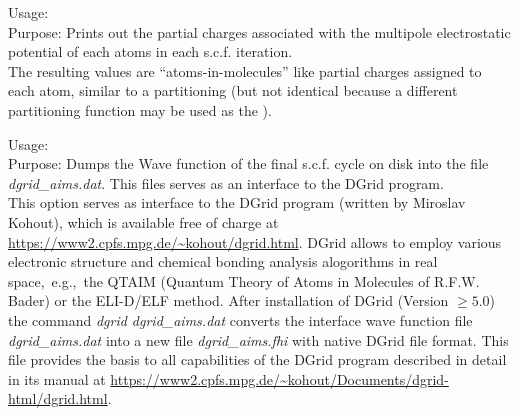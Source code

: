 {
  \noindent
  Usage:   \\[1.0ex]
  Purpose: Prints out the partial charges associated with the
    multipole electrostatic potential of each atoms in each
    s.c.f. iteration. \\[1.0ex]
}
The resulting values are ``atoms-in-molecules'' like partial charges
assigned to each atom, similar to a 
partitioning (but not identical because a different partitioning
function may be used as the ).


{
  \noindent
  Usage:   \\[1.0ex]
  Purpose: Dumps the Wave function of the final s.c.f. cycle on
  disk into the file \emph{dgrid\_aims.dat}. This files serves
  as an interface to the DGrid program.\\[1.0ex]
}
This option serves as interface to the DGrid program (written by Miroslav Kohout),
which is available free of charge at \url{https://www2.cpfs.mpg.de/~kohout/dgrid.html}.
DGrid allows to employ various electronic structure and chemical bonding analysis
alogorithms in real space,~e.g.,~the QTAIM (Quantum Theory of Atoms in Molecules
of R.F.W. Bader) or the ELI-D/ELF method. After installation of DGrid (Version $\ge 5.0$)
the command \emph{dgrid dgrid\_aims.dat} converts the interface wave function file
\emph{dgrid\_aims.dat} into a new file \emph{dgrid\_aims.fhi} with native DGrid file
format. This file provides the basis to all capabilities of the DGrid program
described in detail in its manual at \url{https://www2.cpfs.mpg.de/~kohout/Documents/dgrid-html/dgrid.html}.


